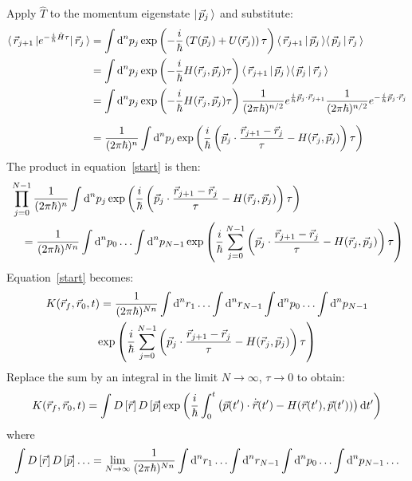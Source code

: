 Apply $\hat{T}$ to the momentum eigenstate $\lvert\,\vec{p}_j\,\rangle$ and substitute:
\begin{align*}
  \langle\,\vec{r}_{j + 1}\,\rvert
  e^{-\frac{i}{\hbar}\hat{H}\tau}
  \lvert\,\vec{r}_j\,\rangle
   & =
  \int\text{d}^{n}p_{j}
  \exp\left(-\frac{i}{\hbar}\left(T(\vec{p}_j) + U(\vec{r}_j)\right)\tau\right)
  \langle\,\vec{r}_{j + 1}\,\vert\,\vec{p}_j\,\rangle
  \langle\,\vec{p}_j\,\vert\,\vec{r}_j\,\rangle
  \\
   & =
  \int\text{d}^{n}p_{j}
  \exp\left(-\frac{i}{\hbar} H(\vec{r}_j, \vec{p}_j)\tau\right)
  \langle\,\vec{r}_{j + 1}\,\vert\,\vec{p}_j\,\rangle
  \langle\,\vec{p}_j\,\vert\,\vec{r}_j\,\rangle
  \\
   & =
  \int\text{d}^{n}p_{j}
  \exp\left(-\frac{i}{\hbar} H(\vec{r}_j, \vec{p}_j)\tau\right)
  \frac{1}{(2\pi\hbar)^{n/2}} e^{\frac{i}{\hbar}\vec{p}_j \cdot \vec{r}_{j + 1}}
  \frac{1}{(2\pi\hbar)^{n/2}} e^{-\frac{i}{\hbar}\vec{p}_j \cdot \vec{r}_{j}}
  \\[1.5ex]
   & =
  \frac{1}{(2\pi\hbar)^{n}}
  \int\text{d}^{n}p_{j}
  \exp\left(\frac{i}{\hbar}\left(
  \vec{p}_j\cdot\frac{\vec{r}_{j + 1}-\vec{r}_j}{\tau} - H(\vec{r}_j, \vec{p}_j)
  \right)\tau\right)
\end{align*}
The product in equation~\ref{start} is then:
\begin{align*}
   & \prod_{j = 0}^{N - 1}
  \frac{1}{(2\pi\hbar)^{n}}
  \int\text{d}^{n}p_{j}
  \exp\left(\frac{i}{\hbar}\left(
  \vec{p}_j \cdot \frac{\vec{r}_{j + 1}-\vec{r}_j}{\tau} - H(\vec{r}_j, \vec{p}_j)
  \right)\tau\right)
  \\
   & \quad =
  \frac{1}{(2\pi\hbar)^{N n}}
  \int\text{d}^{n}p_{0}\ldots\int\text{d}^{n}p_{N - 1}
  \exp\left(\frac{i}{\hbar}\sum_{j = 0}^{N - 1}\left(
  \vec{p}_j \cdot \frac{\vec{r}_{j + 1}-\vec{r}_j}{\tau} - H(\vec{r}_j, \vec{p}_j)
  \right)\tau\right)
\end{align*}
Equation~\ref{start} becomes:
\begin{multline*}
  K(\vec{r}_f, \vec{r}_0, t) =
  \frac{1}{(2\pi\hbar)^{N n}}
  \int\text{d}^{n}r_{1}\ldots\int\text{d}^{n}r_{N - 1}\int\text{d}^{n}p_{0}\ldots\int\text{d}^{n}p_{N - 1}
  \\
  \exp\left(\frac{i}{\hbar}\sum_{j = 0}^{N - 1}\left(
  \vec{p}_j \cdot \frac{\vec{r}_{j + 1}-\vec{r}_j}{\tau} - H(\vec{r}_j, \vec{p}_j)
  \right)\tau\right)
\end{multline*}
Replace the sum by an integral in the limit $N \to \infty$, $\tau \to 0$ to obtain:
\begin{equation*}
  K(\vec{r}_f, \vec{r}_0, t) = \int D\left[{\vec{r}}\right]D\left[{\vec{p}}\right]\exp\left(
  \frac{i}{\hbar}\int_{0}^{t}\left(
  \vec{p}(t^\prime) \cdot \dot{\vec{r}}(t^\prime) - H(\vec{r}(t^\prime), \vec{p}(t^\prime))
  \right)\text{d}{}{t^\prime}
  \right)
\end{equation*}
where
\begin{equation*}
  \int D\left[{\vec{r}}\right]D\left[{\vec{p}}\right]\ldots
  = \lim_{N \to \infty}
  \frac{1}{(2\pi\hbar)^{N n}}
  \int\text{d}^{n}r_{1}\ldots\int\text{d}^{n}r_{N - 1}
  \int\text{d}^{n}p_{0}\ldots\int\text{d}^{n}p_{N - 1}
  \ldots
\end{equation*}
